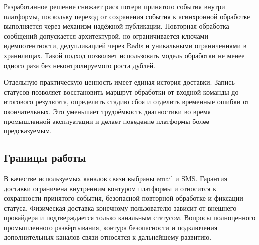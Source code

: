 Разработанное решение снижает риск потери принятого события внутри платформы, поскольку переход от сохранения события к асинхронной обработке выполняется через механизм надёжной публикации. Повторная обработка сообщений допускается архитектурой, но ограничивается ключами идемпотентности, дедупликацией через Redis и уникальными ограничениями в хранилищах. Такой подход позволяет использовать модель обработки не менее одного раза без неконтролируемого роста дублей.

Отдельную практическую ценность имеет единая история доставки. Запись статусов позволяет восстановить маршрут обработки от входной команды до итогового результата, определить стадию сбоя и отделить временные ошибки от окончательных. Это уменьшает трудоёмкость диагностики во время промышленной эксплуатации и делает поведение платформы более предсказуемым.

\subsection*{Границы работы}

В качестве используемых каналов связи выбраны email и SMS. Гарантия доставки ограничена внутренним контуром платформы и относится к сохранности принятого события, безопасной повторной обработке и фиксации статуса. Физическая доставка конечному пользователю зависит от внешнего провайдера и подтверждается только канальным статусом. Вопросы полноценного промышленного развёртывания, контура безопасности и подключения дополнительных каналов связи относятся к дальнейшему развитию.
